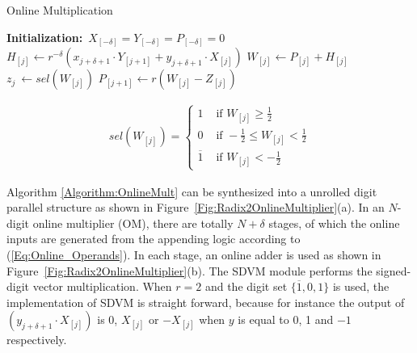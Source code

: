 \documentclass[journal]{IEEEtran}
\begin{document}
\begin{algorithm}[tbp]
  \caption{Online Multiplication}  \label{Algorithm:OnlineMult}
  \begin{algorithmic}[1]
   \State \textbf{Initialization:}~$X_{[-\delta]}=Y_{[-\delta]}=P_{[-\delta]}=0$\vspace{.5ex}
    \vspace{.5ex}
        \State $H_{[j]} \leftarrow r^{-\delta}\left(x_{j+\delta+1}\cdot Y_{[j+1]}+y_{j+\delta+1}\cdot X_{[j]}\right)$\vspace{.5ex}
        \State $W_{[j]} \leftarrow P_{[j]} + H_{[j]}$\vspace{.5ex}
        \State $z_{j}~ \leftarrow sel(W_{[j]})$\vspace{.5ex}
        \State $P_{[j+1]} \leftarrow r\left(W_{[j]}-Z_{[j]}\right)$\vspace{.5ex}
    \EndFor
  \end{algorithmic}
\end{algorithm}

\begin{eqnarray}\label{Eq:SelFunc_OM}
  sel(W_{[j]})=\begin{cases}
    1 & \text{ if } W_{[j]} \geqslant \frac{1}{2} \\
    0 & \text{ if } -\frac{1}{2}\leqslant W_{[j]}<\frac{1}{2} \\
    \overline{1} & \text{ if } W_{[j]}<-\frac{1}{2}
  \end{cases}
\end{eqnarray}

Algorithm \ref{Algorithm:OnlineMult} can be synthesized into a unrolled digit parallel structure as shown in  Figure~\ref{Fig:Radix2OnlineMultiplier}(a). In an $N$-digit online multiplier (OM), there are totally $N+\delta$ stages, of which the online inputs are generated from the appending logic according to (\ref{Eq:Online_Operands}). In each stage, an online adder is used as shown in Figure~\ref{Fig:Radix2OnlineMultiplier}(b). The SDVM module performs the signed-digit vector multiplication. When $r=2$ and the digit set $\{\overline{1},0,1\}$ is used, the implementation of SDVM is straight forward, because for instance the output of $(y_{j+\delta+1}\cdot X_{[j]})$ is 0, $X_{[j]}$ or $-X_{[j]}$ when $y$ is equal to 0, 1 and $-1$ respectively.
\end{document}
